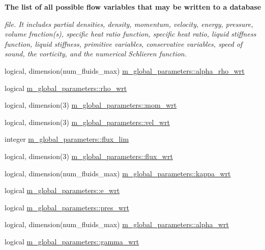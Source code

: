 \begin{Indent}\textbf{ The list of all possible flow variables that may be written to a database}\par
{\em file. It includes partial densities, density, momentum, velocity, energy, pressure, volume fraction(s), specific heat ratio function, specific heat ratio, liquid stiffness function, liquid stiffness, primitive variables, conservative variables, speed of sound, the vorticity, and the numerical Schlieren function. }\begin{DoxyCompactItemize}
\item 
logical, dimension(num\+\_\+fluids\+\_\+max) \hyperlink{namespacem__global__parameters_a629b922f4d06112a6d03d7864872990f}{m\+\_\+global\+\_\+parameters\+::alpha\+\_\+rho\+\_\+wrt}
\item 
logical \hyperlink{namespacem__global__parameters_aabc3362b8f53b08f4f113e699d449754}{m\+\_\+global\+\_\+parameters\+::rho\+\_\+wrt}
\item 
logical, dimension(3) \hyperlink{namespacem__global__parameters_a5d11d820127525a02b4c6f9d09fad258}{m\+\_\+global\+\_\+parameters\+::mom\+\_\+wrt}
\item 
logical, dimension(3) \hyperlink{namespacem__global__parameters_ae4ab7caa7dee5e616b217437f7f2b87f}{m\+\_\+global\+\_\+parameters\+::vel\+\_\+wrt}
\item 
integer \hyperlink{namespacem__global__parameters_acbb163a79ff0011a4327c3fb65a04c14}{m\+\_\+global\+\_\+parameters\+::flux\+\_\+lim}
\item 
logical, dimension(3) \hyperlink{namespacem__global__parameters_a35133a9d59c33919af73594f804d2fd9}{m\+\_\+global\+\_\+parameters\+::flux\+\_\+wrt}
\item 
logical, dimension(num\+\_\+fluids\+\_\+max) \hyperlink{namespacem__global__parameters_ab6d5da2756e61a0695236e24ad920e38}{m\+\_\+global\+\_\+parameters\+::kappa\+\_\+wrt}
\item 
logical \hyperlink{namespacem__global__parameters_a81724112f8d98fe4345fc37eb13a51b2}{m\+\_\+global\+\_\+parameters\+::e\+\_\+wrt}
\item 
logical \hyperlink{namespacem__global__parameters_a444f5e3df80f338ae77ccecd326a325f}{m\+\_\+global\+\_\+parameters\+::pres\+\_\+wrt}
\item 
logical, dimension(num\+\_\+fluids\+\_\+max) \hyperlink{namespacem__global__parameters_a61f570bcde70f7013523e11d93c66929}{m\+\_\+global\+\_\+parameters\+::alpha\+\_\+wrt}
\item 
logical \hyperlink{namespacem__global__parameters_a610d39b1d30ffa66fead89c936c83226}{m\+\_\+global\+\_\+parameters\+::gamma\+\_\+wrt}

\end{DoxyCompactItemize}
\end{Indent}
